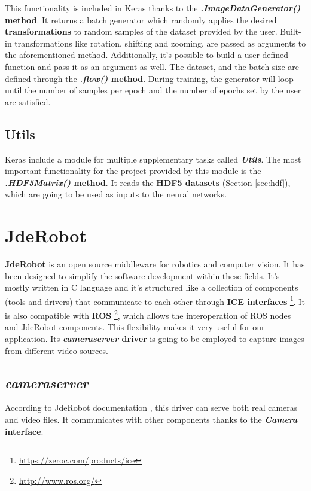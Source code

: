 This functionality is included in Keras thanks to the \textbf{\textit{.ImageDataGenerator()} method}. It returns a batch generator which randomly applies the desired \textbf{transformations} to random samples of the dataset provided by the user. Built-in transformations like rotation, shifting and zooming, are passed as arguments to the aforementioned method. Additionally, it's possible to build a user-defined function and pass it as an argument as well. The dataset, and the batch size are defined through the \textbf{\textit{.flow()} method}. During training, the generator will loop until the number of samples per epoch and the number of epochs set by the user are satisfied.

\subsection{Utils}
Keras include a module for multiple supplementary tasks called \textbf{\textit{Utils}}. The most important functionality for the project provided by this module is the \textbf{\textit{.HDF5Matrix()} method}. It reads the \textbf{HDF5 datasets} (Section \ref{sec:hdf}), which are going to be used as inputs to the neural networks.

\section{JdeRobot}\label{sec:jderobot}
\textbf{JdeRobot} \cite{jderobot} is an open source middleware for robotics and computer vision. It has been designed to simplify the software development within these fields. It's mostly written in C\nolinebreak[4]\hspace{-.05em}\raisebox{.4ex}{\tiny\bf ++} language and it's structured like a collection of components (tools and drivers) that communicate to each other through \textbf{ICE interfaces} \footnote{\url{https://zeroc.com/products/ice}}. It is also compatible with \textbf{ROS} \footnote{\url{http://www.ros.org/}}, which allows the interoperation of ROS nodes and JdeRobot components. This flexibility makes it very useful for our application.
Its \textbf{\textit{cameraserver} driver} is going to be employed to capture images from different video sources.

\subsection{\textit{cameraserver}}\label{subsec:cameraserver}
According to JdeRobot documentation \cite{jderobot}, this driver can serve both real cameras and video files. It communicates with other components thanks to the \textbf{\textit{Camera} interface}.

